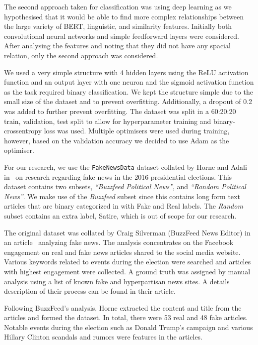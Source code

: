 \documentclass{article}
\begin{document}


The second approach taken for classification was using deep learning as we hypothesised that it would be able to find more complex relationships between the large variety of BERT, linguistic, and similarity features. Initially both convolutional neural networks and simple feedforward layers were considered. After analysing the features and noting that they did not have any spacial relation, only the second approach was considered.

We used a very simple structure with 4 hidden layers using the ReLU activation function and an output layer with one neuron and the sigmoid activation function as the task required binary classification. We kept the structure simple due to the small size of the dataset and to prevent overfitting. Additionally, a dropout of 0.2 was added to further prevent overfitting. The dataset was split in a 60:20:20 train, validation, test split to allow for hyperparameter training and binary-crossentropy loss was used. Multiple optimisers were used during training, however, based on the validation accuracy we decided to use Adam as the optimiser.



For our research, we use the \verb|FakeNewsData| dataset collated by Horne and Adali in~\cite{horne2017} on research regarding fake news in the 2016 presidential elections. This dataset contains two subsets, \emph{``Buzzfeed Political News''}, and \emph{``Random Political News''}. We make use of the \emph{Buzzfeed} subset since this contains long form text articles that are binary categorized in with Fake and Real labels. The \emph{Random} subset contains an extra label, Satire, which is out of scope for our research.

The original dataset was collated by Craig Silverman (BuzzFeed News Editor) in an article~\cite{dataset-buzzfeed} analyzing fake news. The analysis concentrates on the Facebook engagement on real and fake news articles shared to the social media website. Various keywords related to events during the election were searched and articles with highest engagement were collected. A ground truth was assigned by manual analysis using a list of known fake and hyperpartisan news sites. A details description of their process can be found in their article.

Following BuzzFeed's analysis, Horne extracted the content and title from the articles and formed the dataset. In total, there were 53 real and 48 fake articles. Notable events during the election such as Donald Trump's campaign and various Hillary Clinton scandals and rumors were features in the articles.
\end{document}
